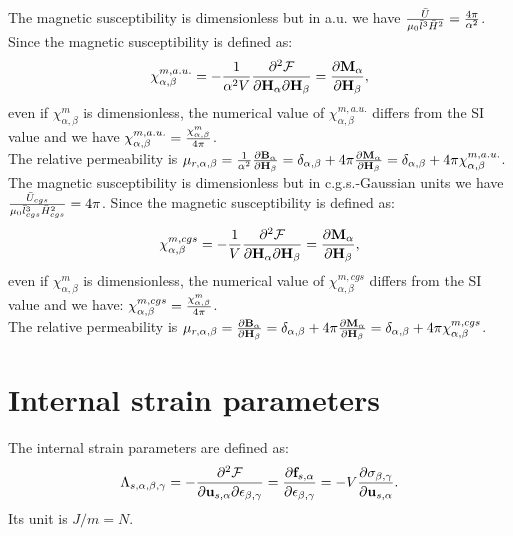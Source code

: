 \documentclass[12pt,a4paper]{article}
\begin{document}
{\color{web-blue} The magnetic susceptibility is dimensionless but
in a.u. we have
${\bar U \over \mu_0 \bar l^3 \bar H^2}={4\pi \over \alpha^2}$.
Since the magnetic susceptibility is defined as:
\begin{equation}
\chi^{m,a.u.}_{\alpha,\beta}=-{1 \over \alpha^2 V} 
{\partial^2 \mathcal{F} \over \partial 
{\bf H}_{\alpha} \partial {\bf H}_{\beta}}
={\partial {\bf M}_{\alpha} \over \partial {\bf H}_{\beta}},
\end{equation}
even if $\chi^m_{\alpha,\beta}$ is dimensionless,
the numerical value of $\chi^{m,a.u.}_{\alpha,\beta}$ differs from the
SI value and we have
$\chi^{m,a.u.}_{\alpha,\beta} = {\chi^m_{\alpha,\beta} \over 4 \pi}$. \\
The relative permeability is $\mu_{r,\alpha,\beta}=
{1\over \alpha^2}{\partial {\bf B}_{\alpha} \over \partial {\bf H}_\beta}=
\delta_{\alpha,\beta} 
+4 \pi {\partial {\bf M}_\alpha \over \partial {\bf H}_\beta} = 
\delta_{\alpha,\beta} + 
4 \pi \chi^{m,a.u.}_{\alpha,\beta}$.
}
\\

{\color{orange} The magnetic susceptibility is dimensionless but
in c.g.s.-Gaussian units we have
${\bar U_{cgs} \over \mu_0 \bar l_{cgs}^3 \bar H_{cgs}^2}=
{4\pi}$. Since the magnetic susceptibility is defined as:
\begin{equation}
\chi^{m,cgs}_{\alpha,\beta}=-{1 \over V} 
{\partial^2 \mathcal{F} \over \partial 
{\bf H}_{\alpha} \partial {\bf H}_{\beta}}=
{\partial {\bf M}_{\alpha} \over \partial {\bf H}_{\beta}},
\end{equation}
even if $\chi^m_{\alpha,\beta}$ is dimensionless,
the numerical value of $\chi^{m,cgs}_{\alpha,\beta}$ differs from the
SI value and we have:
$\chi^{m,cgs}_{\alpha,\beta} = {\chi^m_{\alpha,\beta} \over 4 \pi}$. \\
The relative permeability is $\mu_{r,\alpha,\beta}=
{\partial {\bf B}_{\alpha} \over \partial {\bf H}_\beta}=
\delta_{\alpha,\beta} 
+4 \pi {\partial {\bf M}_\alpha \over \partial {\bf H}_\beta} = 
\delta_{\alpha,\beta} + 
4 \pi \chi^{m,cgs}_{\alpha,\beta}$.
}

\newpage
\section{\color{coral}Internal strain parameters}
The internal strain parameters are defined as:
\begin{equation}
\Lambda_{s,\alpha,\beta,\gamma}=-{\partial^2 \mathcal{F} \over \partial 
{\bf u}_{s,\alpha} \partial \epsilon_{\beta,\gamma}}
={\partial {\bf f}_{s,\alpha} \over \partial \epsilon_{\beta,\gamma}}
=-V {\partial \sigma_{\beta,\gamma}\over \partial {\bf u}_{s,\alpha}}.
\label{isp}
\end{equation}
Its unit is $J/m=N$.
\\
\end{document}
